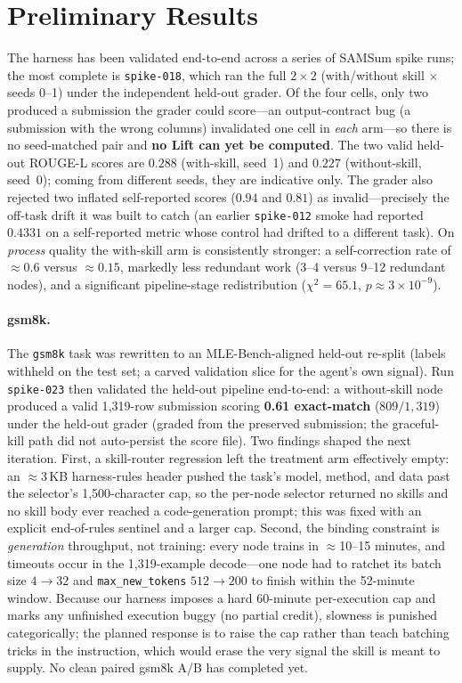 \documentclass[11pt,a4paper]{article}
\begin{document}
\section{Preliminary Results}

The harness has been validated end-to-end across a series of SAMSum spike runs; the most
complete is \texttt{spike-018}, which ran the full $2\times2$ (with/without skill $\times$
seeds 0--1) under the independent held-out grader. Of the four cells, only two produced a
submission the grader could score---an output-contract bug (a submission with the wrong
columns) invalidated one cell in \emph{each} arm---so there is no seed-matched pair and
\textbf{no Lift can yet be computed}. The two valid held-out ROUGE-L scores are $0.288$
(with-skill, seed~1) and $0.227$ (without-skill, seed~0); coming from different seeds, they
are indicative only. The grader also rejected two inflated self-reported scores ($0.94$ and
$0.81$) as invalid---precisely the off-task drift it was built to catch (an earlier
\texttt{spike-012} smoke had reported $0.4331$ on a self-reported metric whose control had
drifted to a different task). On \emph{process} quality the with-skill arm is consistently
stronger: a self-correction rate of $\approx\!0.6$ versus $\approx\!0.15$, markedly less
redundant work (3--4 versus 9--12 redundant nodes), and a significant pipeline-stage
redistribution ($\chi^2 = 65.1$, $p \approx 3\times10^{-9}$).

\paragraph{gsm8k.} The \texttt{gsm8k} task was rewritten to an MLE-Bench-aligned held-out
re-split (labels withheld on the test set; a carved validation slice for the agent's own
signal). Run \texttt{spike-023} then validated the held-out pipeline end-to-end: a
without-skill node produced a valid 1{,}319-row submission scoring \textbf{0.61 exact-match}
($809/1{,}319$) under the held-out grader (graded from the preserved submission; the
graceful-kill path did not auto-persist the score file). Two findings shaped the next
iteration. First, a skill-router regression left the treatment arm effectively empty: an
$\approx$3\,KB harness-rules header pushed the task's model, method, and data past the
selector's 1{,}500-character cap, so the per-node selector returned no skills and no skill
body ever reached a code-generation prompt; this was fixed with an explicit end-of-rules
sentinel and a larger cap. Second, the binding constraint is \emph{generation} throughput,
not training: every node trains in $\approx$10--15 minutes, and timeouts occur in the
1{,}319-example decode---one node had to ratchet its batch size $4\!\rightarrow\!32$ and
\texttt{max\_new\_tokens} $512\!\rightarrow\!200$ to finish within the 52-minute window.
Because our harness imposes a hard 60-minute per-execution cap and marks any unfinished
execution buggy (no partial credit), slowness is punished categorically; the planned response
is to raise the cap rather than teach batching tricks in the instruction, which would erase
the very signal the skill is meant to supply. No clean paired gsm8k A/B has completed yet.
\end{document}
